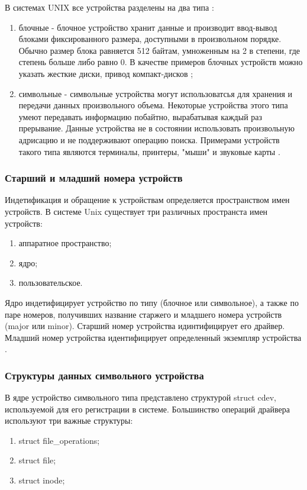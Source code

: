 В системах UNIX все устройства разделены на два типа \cite{5}:
\begin{enumerate}
	\item блочные - блочное устройство хранит данные и производит ввод-вывод блоками фиксированного размера, доступными в произвольном порядке.
	Обычно размер блока равняется 512 байтам, умноженным на 2 в степени, где степень больше либо равно 0.
	В качестве примеров блочных устройств можно указать жесткие диски, привод компакт-дисков \cite{5};
	\item символьные - символьные устройства могут использоватсья для хранения и передачи данных произвольного объема. 
	Некоторые устройства этого типа умеют передавать информацию побайтно, вырабатывая каждый раз прерывание.
	Данные устройства не в состоянии использовать произвольную адрисацию и не поддерживают операцию поиска.
	Примерами устройств такого типа являются терминалы, принтеры, "мыши" и звуковые карты \cite{5}.
\end{enumerate}

\subsubsection{Старший и младший номера устройств}
Индетификация и обращение к устройствам определяется пространством имен устройств.
В системе Unix существует три различных пространста имен устройств:
\begin{enumerate}
	\item аппаратное пространство;
	\item ядро;
	\item пользовательское.
\end{enumerate}

Ядро индетифицирует устройство по типу (блочное или символьное), а также по паре номеров, получивших название старжего и младшего номера устройств (major или minor).
Старший номер устройства идинтифицирует его драйвер. 
Младший номер устройства идентифицирует определенный экземпляр устройства \cite{5}.

\subsubsection{Структуры данных символьного устройства}
В ядре устройство символьного типа представлено структурой struct cdev, используемой для его регистрации в системе.
Большинство операций драйвера используют три важные структуры:
\begin{enumerate}
	\item struct file\_operations;
	\item struct file;
	\item struct inode;
\end{enumerate}

